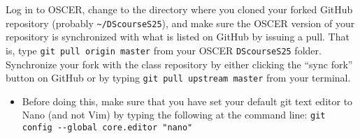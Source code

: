 \documentclass[12pt,english]{exam}
\begin{document}
\begin{questions}
\question Log in to OSCER, change to the directory where you cloned your forked GitHub repository (probably \texttt{\textasciitilde/DScourseS25}), and make sure the OSCER version of your repository is synchronized with what is listed on GitHub by issuing a pull. That is, type \texttt{git pull origin master} from your OSCER \texttt{DScourseS25} folder. 
\question Synchronize your fork with the class repository by either clicking the ``sync fork'' button on GitHub or by typing \texttt{git pull upstream master} from your terminal. 
\begin{itemize}
	\item Before doing this, make sure that you have set your default git text editor to Nano (and not Vim) by typing the following at the command line: \texttt{git config -{}-global core.editor "nano"}
\end{itemize}

\end{questions}
\end{document}
